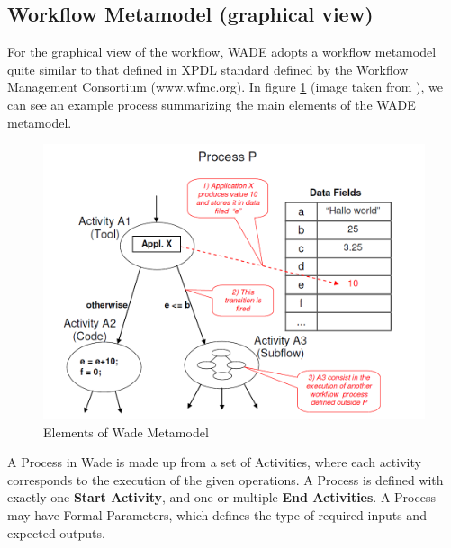 \subsection{Workflow Metamodel (graphical view)}
For the graphical view of the workflow, WADE adopts a workflow metamodel quite similar to that defined in XPDL standard defined by the Workflow Management Consortium (www.wfmc.org). In figure \ref{fig:wade_elements} (image taken from \cite{GCDGMB08}), we can see an example process summarizing the main elements of the WADE metamodel.
\begin{figure}[h]
	\centering
		\includegraphics[width=1.00\textwidth]{images/wade_elements.png}
	\caption{Elements of Wade Metamodel \cite{GCDGMB08}}
	\label{fig:wade_elements}
\end{figure}

A Process in Wade is made up from a set of Activities, where each activity corresponds to the execution of the given operations. A Process is defined with exactly one \textbf{Start Activity}, and one or multiple \textbf{End Activities}. A Process may have Formal Parameters, which defines the type of required inputs and expected outputs.

